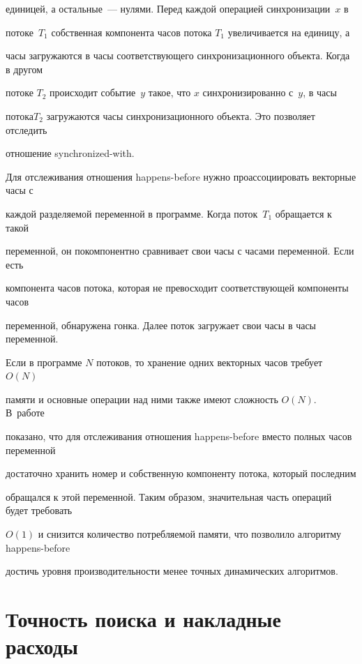 единицей, а остальные~--- нулями. Перед каждой операцией синхронизации~$x$ в

потоке~$T_1$ собственная компонента часов потока $T_1$ увеличивается на единицу, а

часы загружаются в часы соответствующего синхронизационного объекта. Когда в другом

потоке $T_2$ происходит событие~$y$ такое, что $x$ синхронизированно с~$y$, в часы

потока$T_2$ загружаются часы синхронизационного объекта. Это позволяет отследить

отношение synchronized-with.



  Для отслеживания отношения happens-before нужно проассоциировать векторные часы с

каждой разделяемой переменной в программе. Когда поток~$T_1$ обращается к такой

переменной, он покомпонентно сравнивает свои часы с часами переменной. Если есть

компонента часов потока, которая не превосходит соответствующей компоненты часов

переменной, обнаружена гонка. Далее поток загружает свои часы в часы переменной.



   Если в программе $N$ потоков, то хранение одних векторных часов требует $O(N)$

памяти и основные операции над ними также имеют сложность $O(N)$. В~работе~\cite{8-ts}

показано, что для отслеживания отношения happens-before вместо полных часов переменной

достаточно хранить номер и собственную компоненту потока, который последним

обращался к этой переменной. Таким образом, значительная часть операций будет требовать

$O(1)$ и снизится количество потребляемой памяти, что позволило алгоритму happens-before

достичь уровня производительности менее точных динамических алгоритмов.



\vspace*{-4pt}



\section{Точность поиска и накладные расходы}



